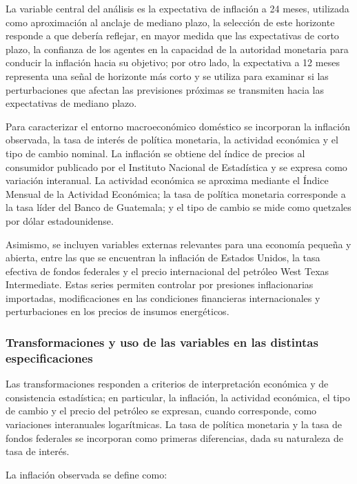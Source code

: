 \documentclass[
  10.5pt,
  letterpaper,
  twocolumn]{article}
\begin{document}
La variable central del análisis es la expectativa de inflación a 24
meses, utilizada como aproximación al anclaje de mediano plazo, la
selección de este horizonte responde a que debería reflejar, en mayor
medida que las expectativas de corto plazo, la confianza de los agentes
en la capacidad de la autoridad monetaria para conducir la inflación
hacia su objetivo; por otro lado, la expectativa a 12 meses representa
una señal de horizonte más corto y se utiliza para examinar si las
perturbaciones que afectan las previsiones próximas se transmiten hacia
las expectativas de mediano plazo.

Para caracterizar el entorno macroeconómico doméstico se incorporan la
inflación observada, la tasa de interés de política monetaria, la
actividad económica y el tipo de cambio nominal. La inflación se obtiene
del índice de precios al consumidor publicado por el Instituto Nacional
de Estadística y se expresa como variación interanual. La actividad
económica se aproxima mediante el Índice Mensual de la Actividad
Económica; la tasa de política monetaria corresponde a la tasa líder del
Banco de Guatemala; y el tipo de cambio se mide como quetzales por dólar
estadounidense.

Asimismo, se incluyen variables externas relevantes para una economía
pequeña y abierta, entre las que se encuentran la inflación de Estados
Unidos, la tasa efectiva de fondos federales y el precio internacional
del petróleo West Texas Intermediate. Estas series permiten controlar
por presiones inflacionarias importadas, modificaciones en las
condiciones financieras internacionales y perturbaciones en los precios
de insumos energéticos.

\subsubsection{Transformaciones y uso de las variables en las distintas
especificaciones}\label{transformaciones-y-uso-de-las-variables-en-las-distintas-especificaciones}

Las transformaciones responden a criterios de interpretación económica y
de consistencia estadística; en particular, la inflación, la actividad
económica, el tipo de cambio y el precio del petróleo se expresan,
cuando corresponde, como variaciones interanuales logarítmicas. La tasa
de política monetaria y la tasa de fondos federales se incorporan como
primeras diferencias, dada su naturaleza de tasa de interés.

La inflación observada se define como:
\end{document}
